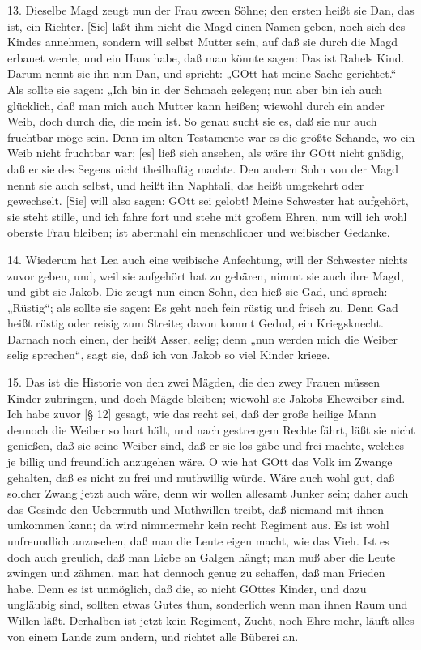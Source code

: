 13. Dieselbe Magd zeugt nun der Frau zween Söhne; den ersten heißt sie Dan, das ist, ein Richter. [Sie] läßt ihm nicht die Magd einen Namen geben, noch sich des Kindes annehmen, sondern will selbst Mutter sein, auf daß sie durch die Magd erbauet werde, und ein Haus habe, daß man könnte sagen: Das ist Rahels Kind. Darum nennt sie ihn nun Dan, und spricht: „GOtt hat meine Sache gerichtet.“ Als sollte sie sagen: „Ich bin in der Schmach gelegen; nun aber bin ich auch glücklich, daß man mich auch Mutter kann heißen; wiewohl durch ein ander Weib, doch durch die, die mein ist. So genau sucht sie es, daß sie nur auch fruchtbar möge sein. Denn im alten Testamente war es die größte Schande, wo ein Weib nicht fruchtbar war; [es] ließ sich ansehen, als wäre ihr GOtt nicht gnädig, daß er sie des Segens nicht theilhaftig machte. Den andern Sohn von der Magd nennt sie auch selbst, und heißt ihn Naphtali, das heißt umgekehrt oder gewechselt. [Sie] will also sagen: GOtt sei gelobt! Meine Schwester hat aufgehört, sie steht stille, und ich fahre fort und stehe mit großem Ehren, nun will ich wohl oberste Frau bleiben; ist abermahl ein menschlicher und weibischer Gedanke.

14. Wiederum hat Lea auch eine weibische Anfechtung, will der Schwester nichts zuvor geben, und, weil sie aufgehört hat zu gebären, nimmt sie auch ihre Magd, und gibt sie Jakob. Die zeugt nun einen Sohn, den hieß sie Gad, und sprach: „Rüstig“; als sollte sie sagen: Es geht noch fein rüstig und frisch zu. Denn Gad heißt rüstig oder reisig zum Streite; davon kommt Gedud, ein Kriegsknecht. Darnach noch einen, der heißt Asser, selig; denn „nun werden mich die Weiber selig sprechen“, sagt sie, daß ich von Jakob so viel Kinder kriege.

15. Das ist die Historie von den zwei Mägden, die den zwey Frauen müssen Kinder zubringen, und doch Mägde bleiben; wiewohl sie Jakobs Eheweiber sind. Ich habe zuvor [§ 12] gesagt, wie das recht sei, daß der große heilige Mann dennoch die Weiber so hart hält, und nach gestrengem Rechte fährt, läßt sie nicht genießen, daß sie seine Weiber sind, daß er sie los gäbe und frei machte, welches je billig und freundlich anzugehen wäre. O wie hat GOtt das Volk im Zwange gehalten, daß es nicht zu frei und muthwillig würde. Wäre auch wohl gut, daß solcher Zwang jetzt auch wäre, denn wir wollen allesamt Junker sein; daher auch das Gesinde den Uebermuth und Muthwillen treibt, daß niemand mit ihnen umkommen kann; da wird nimmermehr kein recht Regiment aus. Es ist wohl unfreundlich anzusehen, daß man die Leute eigen macht, wie das Vieh. Ist es doch auch
greulich, daß man Liebe an Galgen hängt; man muß aber die Leute zwingen und zähmen, man hat dennoch genug zu schaffen, daß man Frieden habe. Denn es ist unmöglich, daß die, so nicht GOttes Kinder, und dazu ungläubig sind, sollten etwas Gutes thun, sonderlich wenn man ihnen Raum und Willen läßt. Derhalben ist jetzt kein Regiment, Zucht, noch Ehre mehr, läuft alles von einem Lande zum andern, und richtet alle Büberei an.

